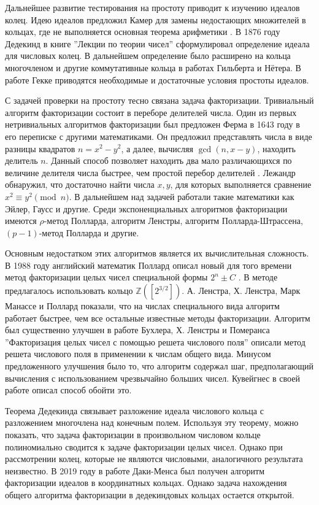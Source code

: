 \documentclass[_dissertation.tex]{subfiles}
\begin{document}
Дальнейшее развитие тестирования на простоту приводит к изучению идеалов колец.
Идею идеалов предложил Камер для замены недостающих множителей в кольцах, где не выполняется основная теорема арифметики \cite{Stillwell}.
В 1876 году Дедекинд в книге ''Лекции по теории чисел''\cite{Dedekind} сформулировал определение идеала для числовых колец.
В дальнейшем определение было расширено на кольца многочленом и другие коммутативные кольца в работах Гильберта и Нётера.
В работе Гекке \cite{Gekke} приводятся необходимые и достаточные условия простоты идеалов.

С задачей проверки на простоту тесно связана задача факторизации.
Тривиальный алгоритм факторизации состоит в переборе делителей числа.
Один из первых нетривиальных алгоритмов факторизации был предложен Ферма в 1643 году в его переписке с другими математиками.
Он предложил представлять числа в виде разницы квадратов $n = x^2 - y^2$, а далее, вычисляя $\gcd(n,x-y)$, находить делитель $n$.
Данный способ позволяет находить два мало различающихся по величине делителя числа быстрее, чем простой перебор делителей \cite{Yaschenko}.
Лежандр обнаружил, что достаточно найти числа $x, y$, для которых выполняется сравнение $x^{2}\equiv y^{2}\pmod{n}$.
В дальнейшем над задачей работали такие математики как Эйлер, Гаусс и другие.
Среди экспоненциальных алгоритмов факторизации имеются $\rho$-метод Полларда, алгоритм Ленстры, алгоритм Полларда-Штрассена, $(p-1)$-метод Полларда и другие.

Основным недостатком этих алгоритмов является их вычислительная сложность.
В 1988 году английский математик Поллард описал новый для того времени метод факторизации целых чисел специальной формы $2^n \pm C$ \cite{Pollard}.
В методе предлагалось использовать кольцо $\mathbb{Z}([2^{3/2}])$.
А. Ленстра, Х. Ленстра, Марк Манассе и Поллард показали, что на числах специального вида алгоритм работает быстрее, чем все остальные известные методы факторизации.
Алгоритм был существенно улучшен в работе Бухлера, Х. Ленстры и Померанса ''Факторизация целых чисел с помощью решета числового поля'' \cite{Buhler} описали метод решета числового поля в применении к числам общего вида.
Минусом предложенного улучшения было то, что алгоритм содержал шаг, предполагающий вычисления с использованием чрезвычайно больших чисел.
Кувейгнес в своей работе \cite{Couveignes} описал способ обойти это.

Теорема Дедекинда связывает разложение идеала числового кольца с разложением многочлена над конечным полем.
Используя эту теорему, можно показать, что задача факторизации в произвольном числовом кольце полиномиально сводится к задаче факторизации целых чисел.
Однако при рассмотрении колец, которые не являются числовыми, аналогичного результата неизвестно.
В 2019 году в работе Даки-Менса \cite{Darkey-Mensah} был получен алгоритм факторизации идеалов в координатных кольцах.
Однако задача нахождения общего алгоритма факторизации в дедекиндовых кольцах остается открытой.
\end{document}
